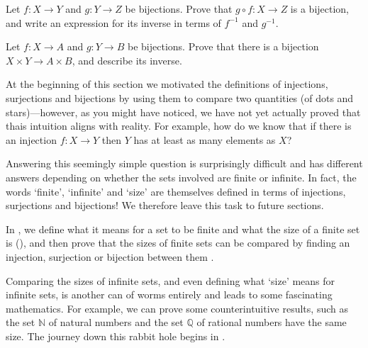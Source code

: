 \begin{exercise}
\label{exCompositeBijection}
Let $f : X \to Y$ and $g : Y \to Z$ be bijections. Prove that $g \circ f : X \to Z$ is a bijection, and write an expression for its inverse in terms of $f^{-1}$ and $g^{-1}$.
\end{exercise}

\begin{exercise}
Let $f : X \to A$ and $g : Y \to B$ be bijections. Prove that there is a bijection $X \times Y \to A \times B$, and describe its inverse.
\end{exercise}

At the beginning of this section we motivated the definitions of injections, surjections and bijections by using them to compare two quantities (of dots and stars)---however, as you might have noticed, we have not yet actually proved that thais intuition aligns with reality. For example, how do we know that if there is an injection $f : X \to Y$ then $Y$ has at least as many elements as $X$?

Answering this seemingly simple question is surprisingly difficult and has different answers depending on whether the sets involved are finite or infinite. In fact, the words `finite', `infinite' and `size' are themselves defined in terms of injections, surjections and bijections! We therefore leave this task to future sections.

In , we define what it means for a set to be finite and what the size of a finite set is (), and then prove that the sizes of finite sets can be compared by finding an injection, surjection or bijection between them .

Comparing the sizes of infinite sets, and even defining what `size' means for infinite sets, is another can of worms entirely and leads to some fascinating mathematics. For example, we can prove some counterintuitive results, such as the set $\mathbb{N}$ of natural numbers and the set $\mathbb{Q}$ of rational numbers have the same size. The journey down this rabbit hole begins in .


